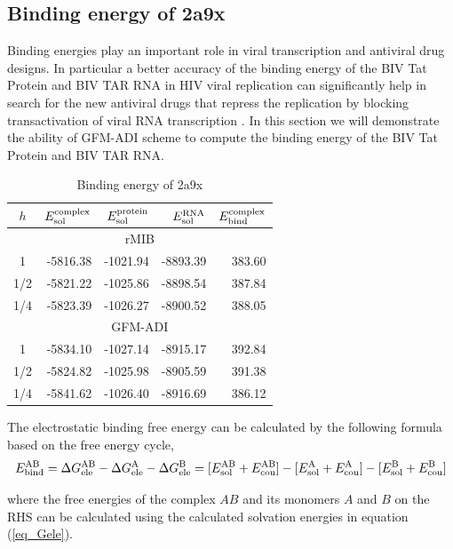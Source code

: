 \subsection{Binding energy of 2a9x}
Binding energies play an important role in viral transcription and antiviral drug designs. In particular a better accuracy of the binding energy of the BIV Tat Protein and BIV TAR RNA in HIV viral replication can significantly help in search for the new antiviral drugs that repress the replication by blocking transactivation of viral RNA transcription \cite{Leeper2005}. In this section we will demonstrate the ability of GFM-ADI scheme to compute the binding energy of the BIV Tat Protein and BIV TAR RNA. 

\begin{table}[H]
\centering
\begin{tabular}{crrrr}
\hline
$h$ & $E_{\rm sol}^{\rm complex}$ & $E_{\rm sol}^{\rm protein}$ & $E_{\rm sol}^{\rm RNA}$ & $E_{\rm bind}^{\rm complex}$ \\ \hline
\multicolumn{5}{c}{rMIB}  \\ \hline
1   & -5816.38 & -1021.94 & -8893.39 & 383.60 \\
1/2 & -5821.22 & -1025.86 & -8898.54 & 387.84 \\
1/4 & -5823.39 & -1026.27 & -8900.52 & 388.05 \\ \hline
\multicolumn{5}{c}{GFM-ADI}  				  \\ \hline
1   & -5834.10 & -1027.14 & -8915.17 & 392.84 \\
1/2 & -5824.82 & -1025.98 & -8905.59 & 391.38 \\
1/4 & -5841.62 & -1026.40 & -8916.69 & 386.12 \\ \hline
\end{tabular}
\caption{Binding energy of 2a9x}
\label{tab_2a9x}
\end{table}

The electrostatic binding free energy can be calculated by the following formula based on the free energy cycle,
\begin{equation}
	E^{\rm AB}_{\rm bind}=\Delta G^{\rm AB}_{\rm ele}-\Delta G^{\rm A}_{\rm ele}-\Delta G^{\rm B}_{\rm ele}\label{eq_bind} =[E^{\rm AB}_{\rm sol}+E^{\rm AB}_{\rm cou}]-[E^{\rm A}_{\rm sol}+E^{\rm A}_{\rm cou}]-[E^{\rm B}_{\rm sol}+E^{\rm B}_{\rm cou}]
\end{equation}
	
where the free energies of the complex $AB$ and its monomers $A$ and $B$ on the RHS can be calculated using the calculated solvation energies in equation (\ref{eq_Gele}). 

